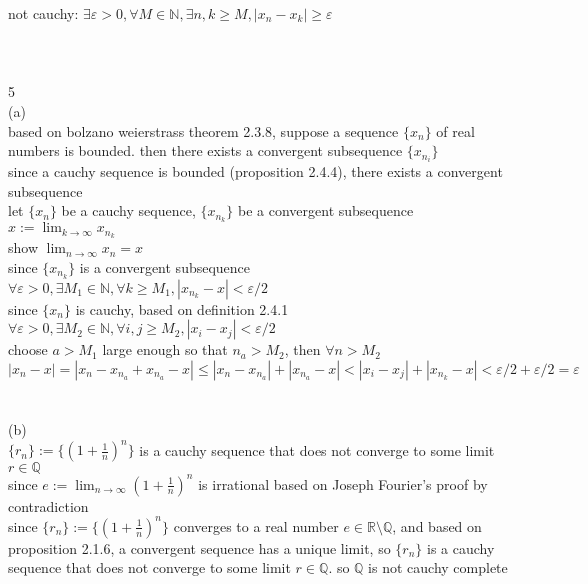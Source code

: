 \documentclass[12pt, border = 4pt, multi]{article} %
\begin{document}
not cauchy: $\exists \varepsilon > 0, \forall M \in \mathbb{N}, \exists n, k \geq M, |x_n - x_k| \geq \varepsilon$\\
\\
\\
\\
5\\
(a)\\
based on bolzano weierstrass theorem 2.3.8, suppose a sequence $\{x_n\}$ of real numbers is bounded. then there exists a convergent subsequence $\{x_{n_i}\}$\\
since a cauchy sequence is bounded (proposition 2.4.4), there exists a convergent subsequence\\
let $\{x_n\}$ be a cauchy sequence, $\{x_{n_k}\}$ be a convergent subsequence\\ $x := \lim_{k \rightarrow \infty} x_{n_k}$\\
show $\lim_{n \rightarrow \infty} x_n = x$\\
since $\{x_{n_k}\}$ is a convergent subsequence\\
$\forall \varepsilon > 0, \exists M_1 \in \mathbb{N}, \forall k \geq M_1, |x_{n_k} - x| < \varepsilon / 2$\\
since $\{x_n\}$ is cauchy, based on definition 2.4.1\\
$\forall \varepsilon > 0, \exists M_2 \in \mathbb{N}, \forall i, j \geq M_2, |x_i - x_j| < \varepsilon / 2$\\
choose $a > M_1$ large enough so that $n_a > M_2$, then $\forall n > M_2$\\
$|x_n - x| = |x_n - x_{n_a} + x_{n_a} - x| \leq |x_n - x_{n_a}| + |x_{n_a} - x| < |x_i - x_j| + |x_{n_k} - x| < \varepsilon / 2 + \varepsilon / 2 = \varepsilon$\\
\\
\\
(b)\\
$\{r_n\} := \{(1 + \frac{1}{n}) ^ n\}$ is a cauchy sequence that does not converge to some limit $r \in \mathbb{Q}$\\
since $e := \lim_{n \rightarrow \infty} (1 + \frac{1}{n}) ^ n$ is irrational based on Joseph Fourier's proof by contradiction\\
since $\{r_n\} := \{(1 + \frac{1}{n}) ^ n\}$ converges to a  real number $e \in \mathbb{R} \setminus \mathbb{Q}$, and based on proposition 2.1.6, a convergent sequence has a unique limit, so $\{r_n\}$ is a cauchy sequence that does not converge to some limit $r \in \mathbb{Q}$. so $\mathbb{Q}$ is not cauchy complete\\
\end{document}
